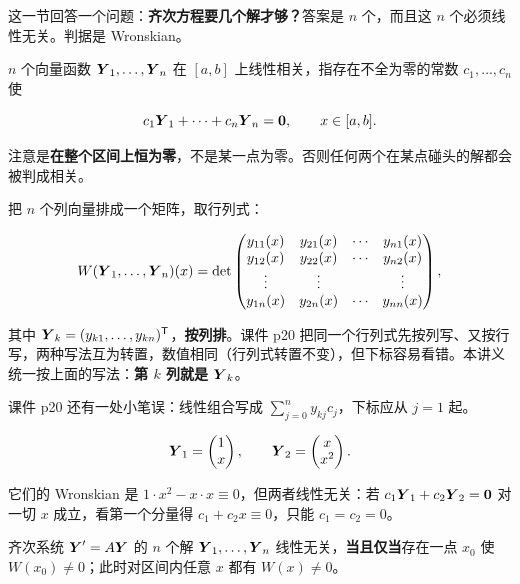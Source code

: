 \documentclass[11pt]{ctexart}
\newcommand{\mat}[1]{\begin{pmatrix}#1\end{pmatrix}}
\begin{document}
这一节回答一个问题：\textbf{齐次方程要几个解才够？}答案是 $n$ 个，而且这 $n$ 个必须线性无关。判据是 Wronskian。


$n$ 个向量函数 $\boldsymbol{Y}_1,\dots,\boldsymbol{Y}_n$ 在 $[a,b]$ 上线性相关，指存在不全为零的常数 $c_1,\dots,c_n$ 使

\[
c_1\boldsymbol{Y}_1+\cdots+c_n\boldsymbol{Y}_n=\boldsymbol{0},\qquad x\in[a,b].
\]

注意是\textbf{在整个区间上恒为零}，不是某一点为零。否则任何两个在某点碰头的解都会被判成相关。


把 $n$ 个列向量排成一个矩阵，取行列式：

\[
W(\boldsymbol{Y}_1,\dots,\boldsymbol{Y}_n)(x)=\det\begin{pmatrix}
y_{11}(x) & y_{21}(x) & \cdots & y_{n1}(x)\\
y_{12}(x) & y_{22}(x) & \cdots & y_{n2}(x)\\
\vdots & \vdots & & \vdots\\
y_{1n}(x) & y_{2n}(x) & \cdots & y_{nn}(x)
\end{pmatrix},
\]

其中 $\boldsymbol{Y}_k=(y_{k1},\dots,y_{kn})^{\mathsf T}$，\textbf{按列排}。课件 p20 把同一个行列式先按列写、又按行写，两种写法互为转置，数值相同（行列式转置不变），但下标容易看错。本讲义统一按上面的写法：\textbf{第 $k$ 列就是 $\boldsymbol{Y}_k$}。

课件 p20 还有一处小笔误：线性组合写成 $\sum_{j=0}^{n}y_{kj}c_j$，下标应从 $j=1$ 起。


\[
\vect{Y}_1=\mat{1\\ x},\qquad \vect{Y}_2=\mat{x\\ x^2}.
\]

它们的 Wronskian 是 $1\cdot x^2-x\cdot x\equiv0$，但两者线性无关：若 $c_1\boldsymbol{Y}_1+c_2\boldsymbol{Y}_2=\boldsymbol{0}$ 对一切 $x$ 成立，看第一个分量得 $c_1+c_2x\equiv0$，只能 $c_1=c_2=0$。



齐次系统 $\boldsymbol{Y}'=A\boldsymbol{Y}$ 的 $n$ 个解 $\boldsymbol{Y}_1,\dots,\boldsymbol{Y}_n$ 线性无关，\textbf{当且仅当}存在一点 $x_0$ 使 $W(x_0)\neq0$；此时对区间内任意 $x$ 都有 $W(x)\neq0$。
\end{document}
